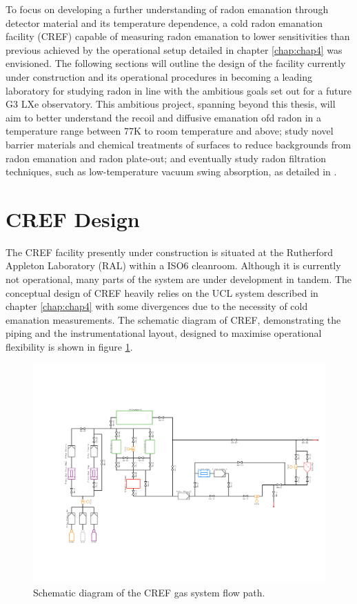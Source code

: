 To focus on developing a further understanding of radon emanation through detector material and its temperature dependence, a cold radon emanation facility (CREF) capable of measuring radon emanation to lower sensitivities than previous achieved by the operational setup detailed in chapter \ref{chap:chap4} was envisioned. The following sections will outline the design of the facility currently under construction and its operational procedures in becoming a leading laboratory for studying radon in line with the ambitious goals set out for a future G3 LXe observatory. This ambitious project, spanning beyond this thesis, will aim to better understand the recoil and diffusive emanation ofd radon in a temperature range between 77K to room temperature and above; study novel barrier materials and chemical treatments of surfaces to reduce backgrounds from radon emanation and radon plate-out; and eventually study radon filtration techniques, such as low-temperature vacuum swing absorption, as detailed in \cite{Street:2017bde}. 


\section{CREF Design}
\label{sec:radon_design}

The CREF facility presently under construction is situated at the 
Rutherford Appleton Laboratory (RAL) within a ISO6 cleanroom. Although it is currently not operational, many parts of the system are under development in tandem. The conceptual design of CREF heavily relies on the UCL system described in chapter \ref{chap:chap4} with some divergences due to the necessity of cold emanation measurements. The schematic diagram of CREF, demonstrating the piping and the instrumentational layout, designed to maximise operational flexibility is shown in figure \ref{fig:cref_pid}.
%
\begin{figure}[h!]
    \centering
    \includegraphics[scale=0.5]{Chapter_7/Figures/cold_radon_pid.pdf}
    \caption[Schematic diagram of the CREF gas system flow path.]%
    {Schematic diagram of the CREF gas system flow path.}
    \label{fig:cref_pid}
\end{figure}
%

